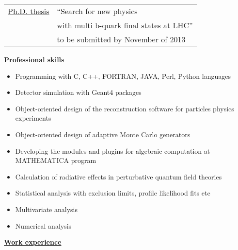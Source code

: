 {{\begin{tabular}{ll}
\underline{Ph.D. thesis} & ``Search for new physics \\
                & with multi b-quark final states at LHC'' \\
                & to be submitted by November of 2013 \\

\end{tabular}

\vspace{3mm}

\begin{center}{\bf{{\underline{Professional skills}}}}\end{center} 

\begin{itemize}
\item{Programming with C, C++, FORTRAN, JAVA, Perl, Python languages} 
\vspace{-2mm}
\item{Detector simulation with  Geant4 packages}
\vspace{-2mm}
\item{Object-oriented design of the reconstruction software for particles  physics experiments }
\vspace{-2mm}
\item{Object-oriented design of adaptive Monte Carlo generators}
\vspace{-2mm}
\item{Developing the modules and plugins for algebraic computation at MATHEMATICA program}
\vspace{-2mm}
\item{Calculation  of radiative effects in perturbative quantum field theories}
\vspace{-2mm}
\item{Statistical analysis with exclusion limits, profile likelihood fits etc }
\vspace{-2mm}
\item{Multivariate analysis}
\vspace{-2mm}
\item{Numerical analysis}
\vspace{-2mm}
\end{itemize}

\newpage

\begin{center}{\bf{{\underline{Work experience}}}}\end{center} 

\vspace{2mm}

}}
